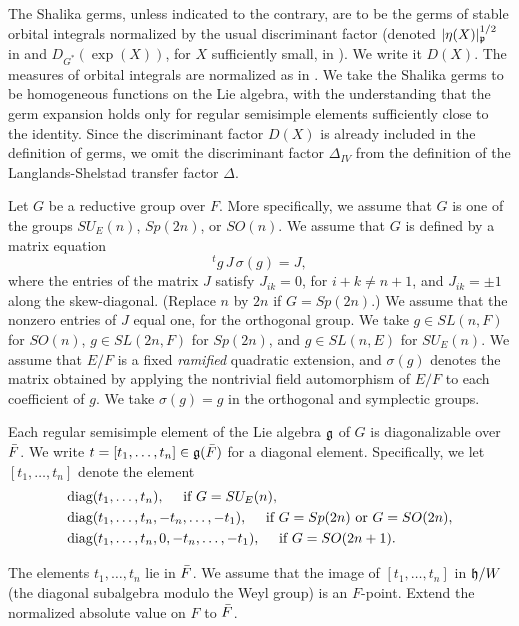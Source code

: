 \documentclass{amsart}
\begin{document}
The Shalika germs, unless indicated to the contrary,
are to be the germs of stable orbital integrals 
normalized by the usual discriminant factor
(denoted $|\eta(X)|^{1/2}_{{\frak p}}$ in \cite{HC} and
$D_{G^*}(\exp(X))$, for $X$ sufficiently small,
 in \cite{LS}).  We write it $D(X)$.
The measures of orbital integrals are normalized as
in \cite{L}.  We take the Shalika germs to be homogeneous
functions on the Lie algebra, with the understanding
that the germ expansion holds only for regular
semisimple elements sufficiently close to the 
identity.  Since the discriminant factor $D(X)$ is
already included in the definition of germs, we omit
the discriminant factor $\Delta_{IV}$ from the
definition of the Langlands-Shelstad transfer factor
$\Delta$.


Let $G$ be a reductive group over $F$. More
specifically, we
assume that $G$ is one of the groups $SU_E(n)$, $Sp(2n)$, or $SO(n)$. We
assume that $G$ is defined by a matrix equation
$${}^tg\,J\,\sigma(g) = J,$$
where the entries of the matrix $J$ satisfy $J_{ik}=0$, for $i+k\ne n+1$,
and $J_{ik}= \pm 1$ along the skew-diagonal. (Replace $n$ by $2n$ if 
$G=Sp(2n)$.)
  We assume that the nonzero
entries of $J$ equal one, for the orthogonal group.  We take $g\in SL(n,F)$
for $SO(n)$, $g\in SL(2n,F)$ for $Sp(2n)$, and 
$g\in SL(n,E)$ for $SU_E(n)$.  We assume that $E/F$ is a fixed
{\it ramified} quadratic extension, and $\sigma(g)$ denotes the matrix
obtained by applying the nontrivial field automorphism of $E/F$ to each
coefficient of $g$.  
We take $\sigma(g) = g$ in the orthogonal and symplectic groups.

Each regular semisimple element of the Lie algebra ${\frak g}$ of $G$ is diagonalizable
over ${\bar F}$.
We write 
$t=[t_1,\ldots,t_n]\in {\frak g}({\bar F})$ for a diagonal element.  Specifically,
we let $[t_1,\ldots,t_n]$ denote the element
\begin{align*}
&\hbox{diag}(t_1,\ldots,t_n),\quad \hbox{ if } G=SU_E(n),\\
&\hbox{diag}(t_1,\ldots,t_n,-t_n,\ldots,-t_1),\quad \hbox{ if } G = Sp(2n) 
   \hbox{ or } G = SO(2n),\\
&\hbox{diag}(t_1,\ldots,t_n,0,-t_n,\ldots,-t_1),\quad \hbox{ if } G = SO(2n+1).
\end{align*}

The elements $t_1,\ldots,t_n$ lie in ${\bar F}$.  We assume that the image
of $[t_1,\ldots,t_n]$ in ${\frak h}/W$ (the diagonal subalgebra modulo the Weyl group)
is an $F$-point.  Extend the normalized absolute value on $F$ to ${\bar F}$.
\end{document}
